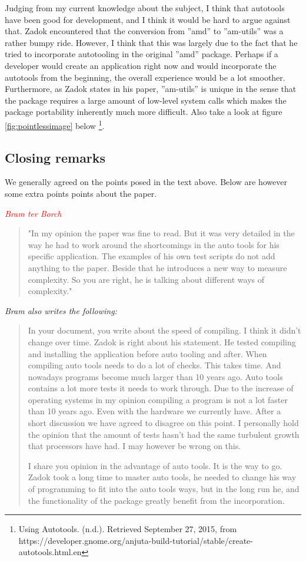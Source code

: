 Judging from my current knowledge about the subject, I think that autotools have been good for development, and I think it would be hard to argue against that. Zadok encountered that the conversion from ''amd'' to ''am-utils'' was a rather bumpy ride. However, I think that this was largely due to the fact that he tried to incorporate autotooling in the original ''amd'' package. Perhaps if a developer would create an application right now and would incorporate the autotools from the beginning, the overall experience would be a lot smoother. Furthermore, as Zadok states in his paper, ''am-utils'' is unique in the sense that the package requires a large amount of low-level system calls which makes the package portability inherently much more difficult. Also take a look at figure \ref{fig:pointlessimage} below \footnote{Using Autotools. (n.d.). Retrieved September 27, 2015, from https://developer.gnome.org/anjuta-build-tutorial/stable/create-autotools.html.en}.

\subsection{Closing remarks}
We generally agreed on the points posed in the text above. Below are however some extra points points about the paper. 

\emph{\textcolor{red}{Bram ter Borch}}
\begin{quotation}
"In my opinion the paper was fine to read. But it was very detailed in the way he had to work around the shortcomings in the auto tools for his specific application. The examples of his own test scripts do not add anything to the paper. Beside that he introduces a new way to measure complexity. So you are right, he is talking about different ways of complexity."
\end{quotation}
\textit{Bram also writes the following:}

\begin{quotation}
In your document, you write about the speed of compiling. I think it didn't change over time. Zadok is right about his statement. He tested compiling and installing the application before auto tooling and after. When compiling auto tools needs to do a lot of checks. This takes time. And nowadays programs become much larger than 10 years ago. Auto tools contains a lot more tests it needs to work through. Due to the increase of operating systems in my opinion compiling a program is not a lot faster than 10 years ago. Even with the hardware we currently have.
After a short discussion we have agreed to disagree on this point. I personally hold the opinion that the amount of tests hasn't had the same turbulent growth that processors have had. I may however be wrong on this. 

I share you opinion in the advantage of auto tools. It is the way to go. Zadok took a long time to master auto tools, he needed to change his way of programming to fit into the auto tools ways, but in the long run he, and the functionality of the package greatly benefit from the incorporation.
\end{quotation}

